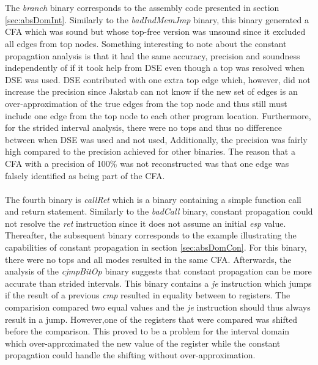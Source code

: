 \documentclass{kththesis}
\renewcommand{\it}[1]{\textit{#1}}
\begin{document}
\\ \\
The \it{branch} binary corresponds to the assembly code presented in section \ref{sec:absDomInt}. Similarly to the \it{badIndMemJmp} binary, this binary generated a CFA which was sound but whose top-free version was unsound since it excluded all edges from top nodes. Something interesting to note about the constant propagation analysis is that it had the same accuracy, precision and soundness independently of if it took help from DSE even though a top was resolved when DSE was used. DSE contributed with one extra top edge which, however, did not increase the precision since Jakstab can not know if the new set of edges is an over-approximation of the true edges from the top node and thus still must include one edge from the top node to each other program location. Furthermore, for the strided interval analysis, there were no tops and thus no difference between when DSE was used and not used, Additionally, the precision was fairly high compared to the precision achieved for other binaries. The reason that a CFA with a precision of 100\% was not reconstructed was that one edge was falsely identified as being part of the CFA.
\\ \\
The fourth binary is \it{callRet} which is a binary containing a simple function call and return statement. Similarly to the \it{badCall} binary, constant propagation could not resolve the \it{ret} instruction since it does not assume an initial \it{esp} value. Thereafter, the subsequent binary corresponds to the example illustrating the capabilities of constant propagation in section \ref{sec:absDomCon}. For this binary, there were no tops and all modes resulted in the same CFA. Afterwards, the analysis of the \it{cjmpBitOp} binary suggests that constant propagation can be more accurate than strided intervals. This binary contains a \it{je} instruction which jumps if the result of a previous \it{cmp} resulted in equality between to registers. The comparision compared two equal values and the \it{je} instruction should thus always result in a jump. However,one of the registers that were compared was shifted before the comparison. This proved to be a problem for the interval domain which over-approximated the new value of the register while the constant propagation could handle the shifting without over-approximation.
\\ \\
\end{document}
